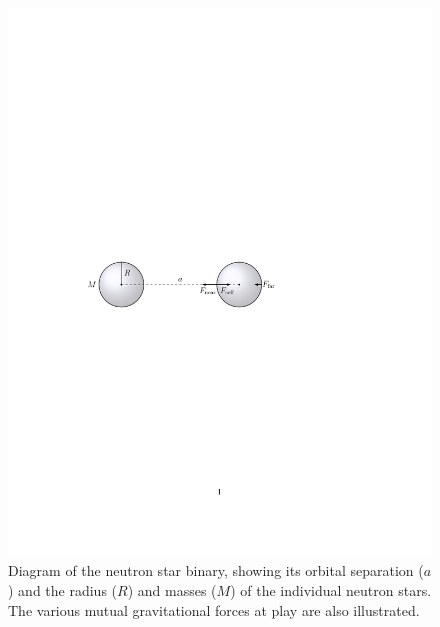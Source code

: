 \documentclass[11pt]{article}
\begin{document}
\vspace{30pt}

\begin{figure}[!h]
\centering
\includegraphics{binary_diagram.pdf}
\caption{\label{fig:binary_diagram}Diagram of the neutron star binary, showing its orbital separation ($a$) and the radius ($R$) and masses ($M$) of the individual neutron stars. The various mutual gravitational forces at play are also illustrated.}
\end{figure}
\end{document}
